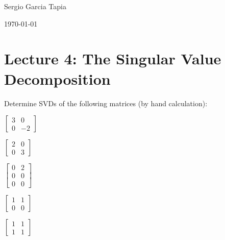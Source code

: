 \documentclass[12pt]{article}
\newenvironment{ex}[2][Exercise]{\begin{trivlist}
		\item[\hskip \labelsep {\bfseries #1}\hskip \labelsep {\bfseries #2.}]}{\end{trivlist}}
\begin{document}

\noindent Sergio Garcia Tapia \hfill

 \hfill 

 \hfill 

\noindent\today
\section*{Lecture 4: The Singular Value Decomposition}

\begin{ex}{1}
	Determine SVDs of the following matrices (by hand calculation):
	
	\begin{enumerate*}[label=(\alph*)]
		\item $\begin{bmatrix}
			3 & 0\\
			0 & -2
		\end{bmatrix}$
		\quad\quad
		\item $\begin{bmatrix}
			2 & 0\\
			0 & 3
		\end{bmatrix}$
		\quad \quad
		\item $\begin{bmatrix}
			0 & 2\\
			0 & 0\\
			0 & 0
		\end{bmatrix}$
		\item $\begin{bmatrix}
			1 & 1\\
			0 & 0
		\end{bmatrix}$
		\quad \quad
		\item $\begin{bmatrix}
			1 & 1\\
			1 & 1
		\end{bmatrix}$
	\end{enumerate*}
\end{ex}
\end{document}
